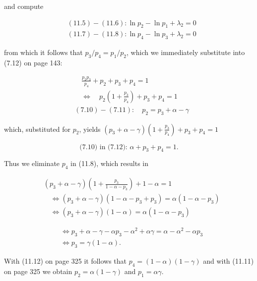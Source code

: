 \documentclass[10pt]{article}
\begin{document}
and compute


\begin{align*}
& (11.5)-(11.6): \ln p_{2}-\ln p_{1}+\lambda_{2}=0  \tag{11.9}\\
& (11.7)-(11.8): \ln p_{4}-\ln p_{3}+\lambda_{2}=0 \tag{11.10}
\end{align*}


from which it follows that $p_{3} / p_{4}=p_{1} / p_{2}$, which we immediately substitute into (7.12) on page 143:


\begin{align*}
& \quad \frac{p_{2} p_{3}}{p_{4}}+p_{2}+p_{3}+p_{4}=1 \\
& \quad \Leftrightarrow \quad p_{2}\left(1+\frac{p_{3}}{p_{4}}\right)+p_{3}+p_{4}=1  \tag{11.11}\\
& (7.10)-(7.11): \quad p_{2}=p_{3}+\alpha-\gamma
\end{align*}


which, substituted for $p_{2}$, yields $\left(p_{3}+\alpha-\gamma\right)\left(1+\frac{p_{3}}{p_{4}}\right)+p_{3}+p_{4}=1$


\begin{equation*}
\text { (7.10) in (7.12): } \alpha+p_{3}+p_{4}=1 \text {. } \tag{11.12}
\end{equation*}


Thus we eliminate $p_{4}$ in (11.8), which results in


\begin{align*}
& \left(p_{3}+\alpha-\gamma\right)\left(1+\frac{p_{3}}{1-\alpha-p_{3}}\right)+1-\alpha=1  \tag{11.13}\\
& \quad \Leftrightarrow\left(p_{3}+\alpha-\gamma\right)\left(1-\alpha-p_{3}+p_{3}\right)=\alpha\left(1-\alpha-p_{3}\right)  \tag{11.14}\\
& \quad \Leftrightarrow\left(p_{3}+\alpha-\gamma\right)(1-\alpha)=\alpha\left(1-\alpha-p_{3}\right) \tag{11.15}
\end{align*}



\begin{align*}
& \Leftrightarrow p_{3}+\alpha-\gamma-\alpha p_{3}-\alpha^{2}+\alpha \gamma=\alpha-\alpha^{2}-\alpha p_{3}  \tag{11.16}\\
& \Leftrightarrow p_{3}=\gamma(1-\alpha) . \tag{11.17}
\end{align*}


With (11.12) on page 325 it follows that $p_{4}=(1-\alpha)(1-\gamma)$ and with (11.11) on page 325 we obtain $p_{2}=\alpha(1-\gamma)$ and $p_{1}=\alpha \gamma$.
\end{document}
